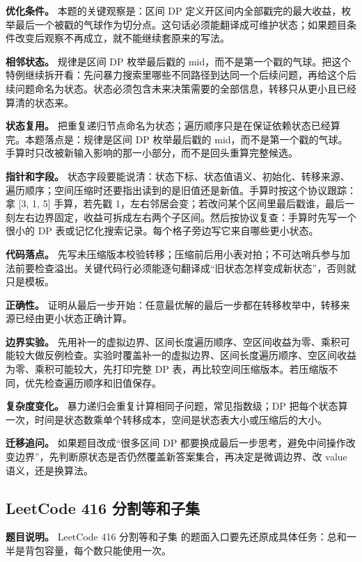 \textbf{优化条件。} 本题的关键观察是：区间 DP 定义开区间内全部戳完的最大收益，枚举最后一个被戳的气球作为切分点。这句话必须能翻译成可维护状态；如果题目条件改变后观察不再成立，就不能继续套原来的写法。

\textbf{相邻状态。} 规律是区间 DP 枚举最后戳的 mid，而不是第一个戳的气球。把这个特例继续拆开看：先问暴力搜索里哪些不同路径到达同一个后续问题，再给这个后续问题命名为状态。状态必须包含未来决策需要的全部信息，转移只从更小且已经算清的状态来。

\textbf{状态复用。} 把重复递归节点命名为状态；遍历顺序只是在保证依赖状态已经算完。本题落点是：规律是区间 DP 枚举最后戳的 mid，而不是第一个戳的气球。手算时只改被新输入影响的那一小部分，而不是回头重算完整候选。

\textbf{指针和字段。} 状态字段要能说清：状态下标、状态值语义、初始化、转移来源、遍历顺序；空间压缩时还要指出读到的是旧值还是新值。手算时按这个协议跟踪：拿 [3, 1, 5] 手算，若先戳 1，左右邻居会变；若改问某个区间里最后戳谁，最后一刻左右边界固定，收益可拆成左右两个子区间。然后按协议复查：手算时先写一个很小的 DP 表或记忆化搜索记录。每个格子旁边写它来自哪些更小状态。

\textbf{代码落点。} 先写未压缩版本校验转移；压缩前后用小表对拍；不可达哨兵参与加法前要检查溢出。关键代码行必须能逐句翻译成“旧状态怎样变成新状态”，否则就只是模板。

\textbf{正确性。} 证明从最后一步开始：任意最优解的最后一步都在转移枚举中，转移来源已经由更小状态正确计算。

\textbf{边界实验。} 先用补一的虚拟边界、区间长度遍历顺序、空区间收益为零、乘积可能较大做反例检查。实验时覆盖补一的虚拟边界、区间长度遍历顺序、空区间收益为零、乘积可能较大，先打印完整 DP 表，再比较空间压缩版本。若压缩版不同，优先检查遍历顺序和旧值保存。

\textbf{复杂度变化。} 暴力递归会重复计算相同子问题，常见指数级；DP 把每个状态算一次，时间是状态数乘单个转移成本，空间是状态表大小或压缩后的大小。

\textbf{迁移追问。} 如果题目改成“很多区间 DP 都要换成最后一步思考，避免中间操作改变边界”，先判断原状态是否仍然覆盖新答案集合，再决定是微调边界、改 value 语义，还是换算法。

\subsection{LeetCode 416 分割等和子集}

\textbf{题目说明。} LeetCode 416 分割等和子集 的题面入口要先还原成具体任务：总和一半是背包容量，每个数只能使用一次。

